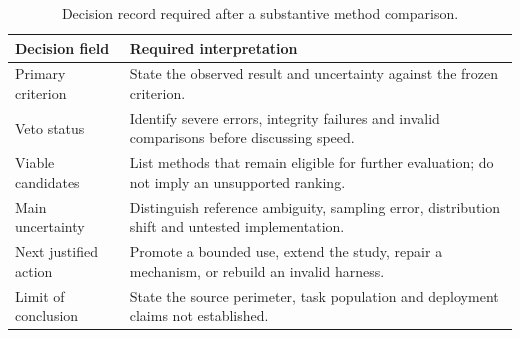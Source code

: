 \begin{table}[htbp]
\centering\small
\caption{Decision record required after a substantive method comparison.}
\begin{tabularx}{\textwidth}{P{39mm}Y}
\toprule
Decision field & Required interpretation\\\midrule
Primary criterion & State the observed result and uncertainty against the frozen criterion.\\
Veto status & Identify severe errors, integrity failures and invalid comparisons before discussing speed.\\
Viable candidates & List methods that remain eligible for further evaluation; do not imply an unsupported ranking.\\
Main uncertainty & Distinguish reference ambiguity, sampling error, distribution shift and untested implementation.\\
Next justified action & Promote a bounded use, extend the study, repair a mechanism, or rebuild an invalid harness.\\
Limit of conclusion & State the source perimeter, task population and deployment claims not established.\\
\bottomrule
\end{tabularx}
\end{table}

